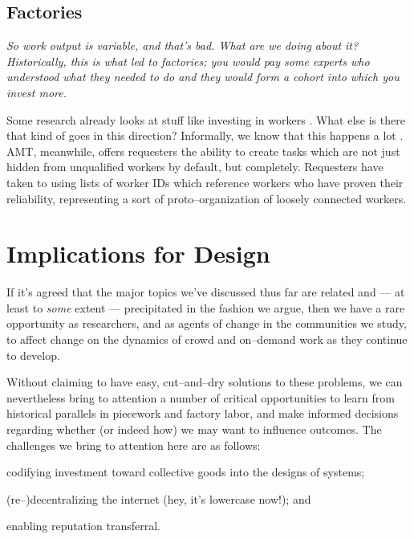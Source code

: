 \documentclass{sigchi}
\begin{document}
\subsection{Factories}\label{sec:Factorization}

\itshape
So work output is variable, and that's bad. What are we doing about it?
Historically, this is what led to factories; you would pay some experts who understood what they needed to do
and they would form a cohort into which you invest more.

Some research already looks at stuff like investing in workers
\cite{shepherdingDow}.
What else is there that kind of goes in this direction?
Informally, we know that this happens a lot
\cite{jonBrelig}.
AMT, meanwhile, offers requesters the ability to create tasks which are
not just hidden from unqualified workers by default, but completely.
Requesters have taken to using lists of worker IDs which reference
workers who have proven their reliability,
representing a sort of proto--organization of loosely connected workers.
\upshape



\section{Implications for Design}
If it's agreed that
the major topics we've discussed thus far are related and
--- at least to \textit{some} extent ---
precipitated in the fashion we argue,
then we have a rare opportunity as researchers,
and as agents of change in the communities we study,
to affect change on the dynamics of crowd and on--demand work
as they continue to develop.

Without claiming to have easy, cut--and--dry solutions to these problems,
we can nevertheless bring to attention a number of critical opportunities to
learn from historical parallels in piecework and factory labor,
and make informed decisions regarding whether
(or indeed how)
we may want to influence outcomes.
The challenges we bring to attention here are as follows:
\begin{inlinelist}
  \item codifying investment toward collective goods into the designs of systems;
  \item (re--)decentralizing the internet (hey, it's lowercase now!); and
  \item enabling reputation transferral.
\end{inlinelist}
\end{document}
